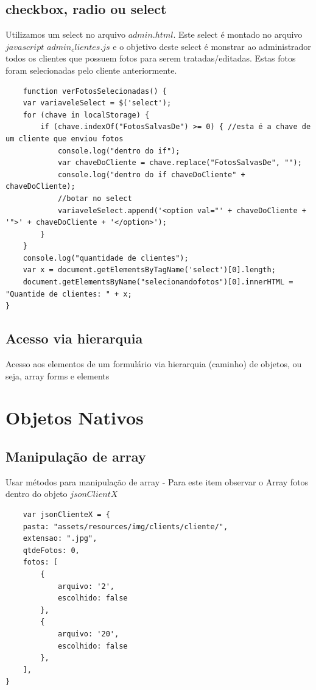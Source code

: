\subsection{checkbox, radio ou select}
	Utilizamos um select no arquivo $admin.html$. Este select é montado no arquivo $javascript$ $admin_clientes.js$ e o objetivo deste select é monstrar ao administrador todos os clientes que possuem fotos para serem tratadas/editadas. Estas fotos foram selecionadas pelo cliente anteriormente.
\begin{lstlisting}	
	function verFotosSelecionadas() {
    var variaveleSelect = $('select');
    for (chave in localStorage) {
        if (chave.indexOf("FotosSalvasDe") >= 0) { //esta é a chave de um cliente que enviou fotos
            console.log("dentro do if");
            var chaveDoCliente = chave.replace("FotosSalvasDe", "");
            console.log("dentro do if chaveDoCliente" + chaveDoCliente);
            //botar no select
            variaveleSelect.append('<option val="' + chaveDoCliente + '">' + chaveDoCliente + '</option>');
        }
    }
    console.log("quantidade de clientes");
    var x = document.getElementsByTagName('select')[0].length;
    document.getElementsByName("selecionandofotos")[0].innerHTML = "Quantide de clientes: " + x;
}

\end{lstlisting}
\subsection{Acesso via hierarquia}
	Acesso aos elementos de um formulário via hierarquia (caminho) de objetos, ou seja, array forms e elements



\section{Objetos Nativos }
\subsection{Manipulação de array}
	Usar métodos para manipulação de array - Para este item observar o Array fotos dentro do objeto $jsonClientX$

\begin{lstlisting}	
	var jsonClienteX = {
    pasta: "assets/resources/img/clients/cliente/",
    extensao: ".jpg",
    qtdeFotos: 0,
    fotos: [
        {
            arquivo: '2',
            escolhido: false
        },
        {
            arquivo: '20',
            escolhido: false
        },
	],
}
\end{lstlisting}

